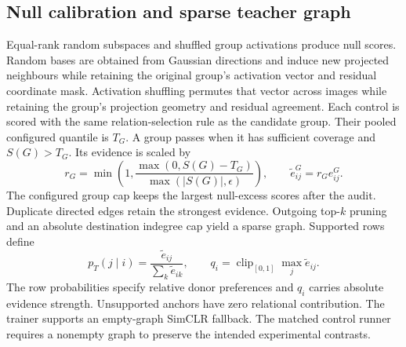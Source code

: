 \documentclass[11pt,a4paper]{article}
\begin{document}
\subsection{Null calibration and sparse teacher graph}
Equal-rank random subspaces and shuffled group activations produce null scores.
Random bases are obtained from Gaussian directions and induce new projected
neighbours while retaining the original group's activation vector and residual
coordinate mask. Activation shuffling permutes that vector across images while
retaining the group's projection geometry and residual agreement. Each control
is scored with the same relation-selection rule as the candidate group.
Their pooled configured quantile is $T_G$. A group passes when it has sufficient
coverage and $S(G)>T_G$. Its evidence is scaled by
\begin{equation}
 r_G=\min\!\left(1,\frac{\max(0,S(G)-T_G)}{\max(|S(G)|,\epsilon)}\right),
 \qquad \tilde e_{ij}^{G}=r_Ge_{ij}^{G}.
\end{equation}
The configured group cap keeps the largest null-excess scores after the audit.
Duplicate directed edges retain
the strongest evidence. Outgoing top-$k$ pruning and an absolute destination
indegree cap yield a sparse graph. Supported rows define
\begin{equation}
 p_T(j\mid i)=\frac{\tilde e_{ij}}{\sum_k\tilde e_{ik}},\qquad
 q_i=\operatorname{clip}_{[0,1]}\max_j\tilde e_{ij}.
\end{equation}
The row probabilities specify relative donor preferences and $q_i$ carries
absolute evidence strength. Unsupported anchors have zero relational contribution.
The trainer supports an empty-graph SimCLR fallback. The matched control runner
requires a nonempty graph to preserve the intended experimental contrasts.
\end{document}
